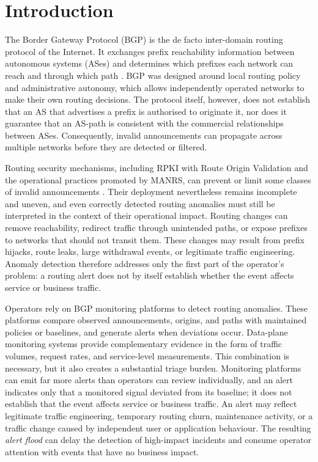 \section{Introduction}
\label{sec:intro}

The Border Gateway Protocol (BGP) is the de facto inter-domain
routing protocol of the Internet. It exchanges prefix reachability
information between autonomous systems (ASes) and determines which
prefixes each network can reach and through which path
\cite{rfc4271}. BGP was designed around local routing policy and
administrative autonomy, which allows independently operated networks
to make their own routing decisions. The protocol itself, however,
does not establish that an AS that advertises a prefix is authorised
to originate it, nor does it guarantee that an AS-path is consistent
with the commercial relationships between ASes. Consequently, invalid
announcements can propagate across multiple networks before they are
detected or filtered.

Routing security mechanisms, including RPKI with Route Origin
Validation and the operational practices promoted by MANRS, can
prevent or limit some classes of invalid announcements
\cite{cooper-2017-rpki,manrs}. Their deployment nevertheless remains
incomplete and uneven, and even correctly detected routing anomalies
must still be interpreted in the context of their operational impact.
Routing changes can remove reachability, redirect traffic through
unintended paths, or expose prefixes to networks that should not
transit them. These changes may result from prefix hijacks, route
leaks, large withdrawal events, or legitimate traffic engineering.
Anomaly detection therefore addresses only the first part of the
operator's problem: a routing alert does not by itself establish
whether the event affects service or business traffic.

Operators rely on BGP monitoring platforms to detect routing
anomalies. These platforms compare observed announcements, origins,
and paths with maintained policies or baselines, and generate alerts
when deviations occur. Data-plane monitoring systems provide
complementary evidence in the form of traffic volumes, request rates,
and service-level measurements. This combination is necessary, but it
also creates a substantial triage burden. Monitoring platforms can
emit far more alerts than operators can review individually, and an
alert indicates only that a monitored signal deviated from its
baseline; it does not establish that the event affects service or
business traffic. An alert may reflect legitimate traffic
engineering, temporary routing churn, maintenance activity, or a
traffic change caused by independent user or application behaviour.
The resulting \emph{alert flood} can delay the detection of high-impact
incidents and consume operator attention with events that have no
business impact.

